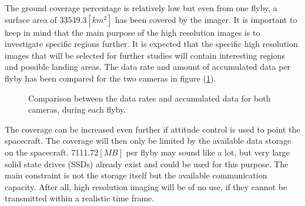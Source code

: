 The ground coverage percentage is relatively low but even from one flyby, a surface area of 33549.3$[km^2]$ has been covered by the imager. It is important to keep in mind that the main purpose of the high resolution images is to investigate specific regions further. It is expected that the specific high resolution images that will be selected for further studies will contain interesting regions and possible landing areas. The data rate and amount of accumulated data per flyby has been compared for the two cameras in figure (\ref{fig:data_gen_wac_nac_compare1}).

\begin{figure}[htb!]
    \centering
    \captionsetup[subfigure]{width=0.45\textwidth}
    \caption{Comparison between the data rates and accumulated data for both cameras, during each flyby.}\label{fig:data_gen_wac_nac_compare1}
\end{figure}

The coverage can be increased even further if attitude control is used to point the spacecraft. The coverage will then only be limited by the available data storage on the spacecraft. 7111.72$[MB]$ per flyby may sound like a lot, but very large solid state drives (SSDs) already exist and could be used for this purpose. The main constraint is not the storage itself but the available communication capacity. After all, high resolution imaging will be of no use, if they cannot be transmitted within a realistic time frame.

